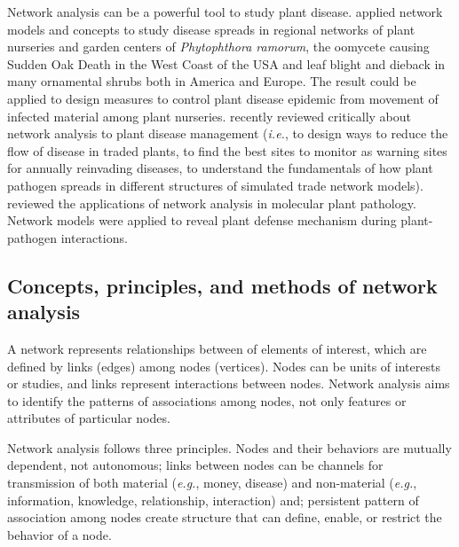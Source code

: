Network analysis can be a powerful tool to study plant disease.  applied network models and concepts to study disease spreads in regional networks of plant nurseries and garden centers of \textit{Phytophthora ramorum}, the oomycete causing Sudden Oak Death in the West Coast of the USA and leaf blight and dieback in many ornamental shrubs both in America and Europe. The result could be applied to design measures to control plant disease epidemic from movement of infected material among plant nurseries.  recently reviewed critically about network analysis to plant disease management (\textit{i.e.}, to design ways to reduce the flow of disease in traded plants, to find the best sites to monitor as warning sites for annually reinvading diseases, to understand the fundamentals of how plant pathogen spreads in different structures of simulated trade network models).  reviewed the applications of network analysis in molecular plant pathology. Network models were applied to reveal plant defense mechanism during plant-pathogen interactions.

\subsection*{Concepts, principles, and methods of network analysis}

A network represents relationships between of elements of interest, which are defined by links (edges) among nodes (vertices). Nodes can be units of interests or studies, and links represent interactions between nodes. Network analysis aims to identify the patterns of associations among nodes, not only features or attributes of particular nodes.

Network analysis follows three principles. Nodes and their behaviors are mutually dependent, not autonomous; links between nodes can be channels for transmission of both material (\textit{e.g.}, money, disease) and non-material (\textit{e.g.}, information, knowledge, relationship, interaction) and; persistent pattern of association among nodes create structure that can define, enable, or restrict the behavior of a node.  

